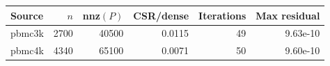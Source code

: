 \begin{tabular}{lrrrrr}
\toprule
Source & $n$ & nnz$(P)$ & CSR/dense & Iterations & Max residual\\
\midrule
pbmc3k & 2700 & 40500 & 0.0115 & 49 & 9.63e-10\\
pbmc4k & 4340 & 65100 & 0.0071 & 50 & 9.60e-10\\
\bottomrule
\end{tabular}
